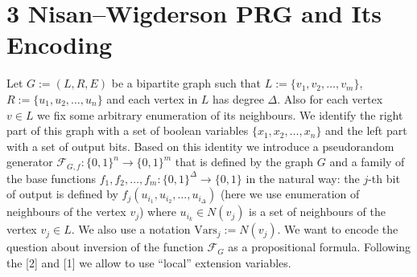 \section*{3 Nisan–Wigderson PRG and Its Encoding}
Let $G:=(L,R,E)$ be a bipartite graph such that $L:=\{v_1,v_2,\ldots,v_m\}$, $R:=\{u_1,u_2,\ldots,u_n\}$ and each vertex in $L$ has degree $\Delta$. Also for each vertex $v\in L$ we fix some arbitrary enumeration of its neighbours. We identify the right part of this graph with a set of boolean variables $\{x_1,x_2,\ldots,x_n\}$ and the left part with a set of output bits. Based on this identity we introduce a pseudorandom generator $\mathcal F_{G,f}:\{0,1\}^n\to\{0,1\}^m$ that is defined by the graph $G$ and a family of the base functions $f_1,f_2,\ldots,f_m:\{0,1\}^\Delta\to\{0,1\}$ in the natural way: the $j$-th bit of output is defined by $f_j(u_{i_1},u_{i_2},\ldots,u_{i_\Delta})$ (here we use enumeration of neighbours of the vertex $v_j$) where $u_{i_k}\in N(v_j)$ is a set of neighbours of the vertex $v_j\in L$. We also use a notation $\mathrm{Vars}_j:=N(v_j)$.
We want to encode the question about inversion of the function $\mathcal F_G$ as a propositional formula. Following the [2] and [1] we allow to use ``local'' extension variables.
